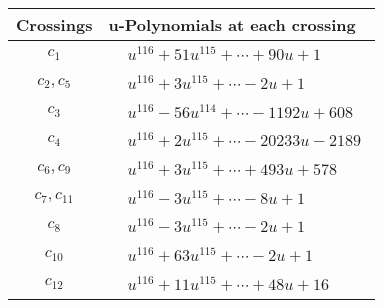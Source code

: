 \documentclass[1p]{elsarticle_modified}
\theoremstyle{definition}
\begin{document}
\begin{tabular}{m{50pt}|m{274pt}}
Crossings & \hspace{64pt}u-Polynomials at each crossing \\
\hline $$\begin{aligned}c_{1}\end{aligned}$$&$\begin{aligned}
&u^{116}+51 u^{115}+\cdots+90 u+1
\end{aligned}$\\
\hline $$\begin{aligned}c_{2},c_{5}\end{aligned}$$&$\begin{aligned}
&u^{116}+3 u^{115}+\cdots-2 u+1
\end{aligned}$\\
\hline $$\begin{aligned}c_{3}\end{aligned}$$&$\begin{aligned}
&u^{116}-56 u^{114}+\cdots-1192 u+608
\end{aligned}$\\
\hline $$\begin{aligned}c_{4}\end{aligned}$$&$\begin{aligned}
&u^{116}+2 u^{115}+\cdots-20233 u-2189
\end{aligned}$\\
\hline $$\begin{aligned}c_{6},c_{9}\end{aligned}$$&$\begin{aligned}
&u^{116}+3 u^{115}+\cdots+493 u+578
\end{aligned}$\\
\hline $$\begin{aligned}c_{7},c_{11}\end{aligned}$$&$\begin{aligned}
&u^{116}-3 u^{115}+\cdots-8 u+1
\end{aligned}$\\
\hline $$\begin{aligned}c_{8}\end{aligned}$$&$\begin{aligned}
&u^{116}-3 u^{115}+\cdots-2 u+1
\end{aligned}$\\
\hline $$\begin{aligned}c_{10}\end{aligned}$$&$\begin{aligned}
&u^{116}+63 u^{115}+\cdots-2 u+1
\end{aligned}$\\
\hline $$\begin{aligned}c_{12}\end{aligned}$$&$\begin{aligned}
&u^{116}+11 u^{115}+\cdots+48 u+16
\end{aligned}$\\
\hline
\end{tabular}\\~\\
\end{document}
